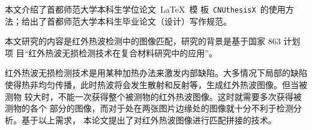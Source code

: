 ﻿
\begin{cnabstract}
本文介绍了首都师范大学本科生学位论文~\LaTeX~模
板~\texttt{CNUthesisX}~的使用方法；给出了首都师范大学本科生毕业论文（设计）写作规范。

本文研究的内容是红外热波检测中的图像匹配，研究的背景是基于国家 863 计划项
目“红外热波无损检测技术在复合材料研究中的应用”。\par
红外热波无损检测技术是用某种加热办法来激发内部缺陷。大多情况下局部的缺陷
使得热非均匀传播，此时热波将会发生散射和反射等，生成红外热波图像。但当被测物
较大时，不能一次获得整个被测物的红外热波图像。这时就需要多次获得被测物的各个
部分的图像，而对于处在两张图片边缘处的图像就十分不利于检测分析。基于以上需求，
本论文提出了对红外热波图像进行匹配拼接的技术。



\end{cnabstract}


\begin{abstract}
This paper is an introduction to \LaTeX{} document class
\texttt{CNUthesisX}. A brief guideline for writing thesis is
also included.

This paper aims to present the methodology of image registration in the field of infrared
thermal wave nondestructive inspection. The background of the research is based on National
project 863 “The application of technology of infrared thermal wave nondestructive
inspection in the research of complex material”
\end{abstract}
